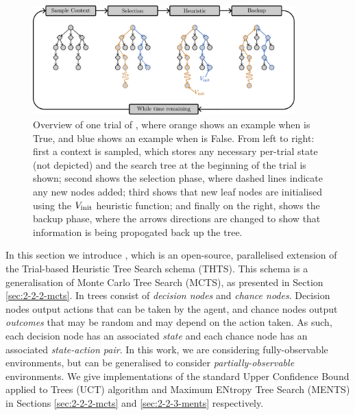     \begin{figure}
        \label{fig:thts}
        \centering\includegraphics[width=0.9\textwidth]{figures/ch2/mcts_diagram_draft.pdf} 
        \caption[Overview of one trial of \thtspp.]{Overview of one trial of \thtspp, where orange shows an example when \mctsmode\ewe is True, and blue shows an example when \mctsmode\ewe is False. From left to right: first a context is sampled, which stores any necessary per-trial state (not depicted) and the search tree at the beginning of the trial is shown; second shows the selection phase, where dashed lines indicate any new nodes added; third shows that new leaf nodes are initialised using the ${V_{\textnormal{init}}}$ heuristic function; and finally on the right, shows the backup phase, where the arrows directions are changed to show that information is being propogated back up the tree. }
    \end{figure}



    In this section we introduce \thtspp\ewe \cite{thtspp}, which is an open-source, parallelised extension of the  Trial-based Heuristic Tree Search schema \cite{thts} (THTS). This schema is a generalisation of Monte Carlo Tree Search (MCTS), as presented in Section \ref{sec:2-2-2-mcts}. In \thtspp\ewe trees consist of \textit{decision nodes} and \textit{chance nodes}. Decision nodes output actions that can be taken by the agent, and chance nodes output \textit{outcomes} that may be random and may depend on the action taken. As such, each decision node has an associated \textit{state} and each chance node has an associated \textit{state-action pair}. In this work, we are considering fully-observable environments, but \thtspp\ewe can be generalised to consider \textit{partially-observable} environments. We give \thtspp\ewe implementations of the standard Upper Confidence Bound applied to Trees (UCT) algorithm and Maximum ENtropy Tree Search (MENTS) in Sections \ref{sec:2-2-2-mcts} and \ref{sec:2-2-3-ments} respectively.

